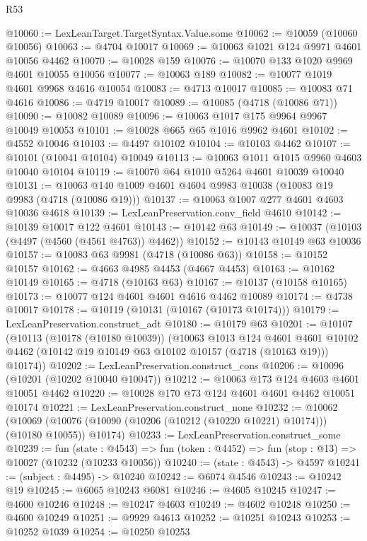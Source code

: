 \begin{lexlean}{R53}
\begin{coremodule}
@10060 := LexLeanTarget.TargetSyntax.Value.some
@10062 := @10059 (@10060 @10056)
@10063 := @4704 @10017
@10069 := @10063 @1021 @124 @9971 @4601 @10056 @4462
@10070 := @10028 @159
@10076 := @10070 @133 @1020 @9969 @4601 @10055 @10056
@10077 := @10063 @189
@10082 := @10077 @1019 @4601 @9968 @4616 @10054
@10083 := @4713 @10017
@10085 := @10083 @71 @4616
@10086 := @4719 @10017
@10089 := @10085 (@4718 (@10086 @71))
@10090 := @10082 @10089
@10096 := @10063 @1017 @175 @9964 @9967 @10049 @10053
@10101 := @10028 @665 @65 @1016 @9962 @4601
@10102 := @4552 @10046
@10103 := @4497 @10102
@10104 := @10103 @4462
@10107 := @10101 (@10041 @10104) @10049
@10113 := @10063 @1011 @1015 @9960 @4603 @10040 @10104
@10119 := @10070 @64 @1010 @5264 @4601 @10039 @10040
@10131 := @10063 @140 @1009 @4601 @4604 @9983 @10038 (@10083 @19 @9983 (@4718 (@10086 @19)))
@10137 := @10063 @1007 @277 @4601 @4603 @10036 @4618
@10139 := LexLeanPreservation.conv_field @4610
@10142 := @10139 @10017 @122 @4601
@10143 := @10142 @63
@10149 := @10037 (@10103 (@4497 (@4560 (@4561 @4763)) @4462))
@10152 := @10143 @10149 @63 @10036
@10157 := @10083 @63 @9981 (@4718 (@10086 @63))
@10158 := @10152 @10157
@10162 := @4663 @4985 @4453 (@4667 @4453)
@10163 := @10162 @10149
@10165 := @4718 (@10163 @63)
@10167 := @10137 (@10158 @10165)
@10173 := @10077 @124 @4601 @4601 @4616 @4462 @10089
@10174 := @4738 @10017
@10178 := @10119 (@10131 (@10167 (@10173 @10174)))
@10179 := LexLeanPreservation.construct_adt
@10180 := @10179 @63
@10201 := @10107
    (@10113
      (@10178 (@10180 @10039))
      (@10063
        @1013
        @124
        @4601
        @4601
        @10102
        @4462
        (@10142 @19 @10149 @63 @10102 @10157 (@4718 (@10163 @19)))
        @10174))
@10202 := LexLeanPreservation.construct_cons
@10206 := @10096 (@10201 (@10202 @10040 @10047))
@10212 := @10063 @173 @124 @4603 @4601 @10051 @4462
@10220 := @10028 @170 @73 @124 @4601 @4601 @4462 @10051 @10174
@10221 := LexLeanPreservation.construct_none
@10232 := @10062
    (@10069 (@10076 (@10090 (@10206 (@10212 (@10220 @10221) @10174))) (@10180 @10055)) @10174)
@10233 := LexLeanPreservation.construct_some
@10239 := fun (state : @4543) =>
  fun (token : @4452) => fun (stop : @13) => @10027 (@10232 (@10233 @10056))
@10240 := (state : @4543) -> @4597
@10241 := (subject : @4495) -> @10240
@10242 := @6074 @4546
@10243 := @10242 @19
@10245 := @6065 @10243 @6081
@10246 := @4605 @10245
@10247 := @4600 @10246
@10248 := @10247 @4603
@10249 := @4602 @10248
@10250 := @4600 @10249
@10251 := @9929 @4613
@10252 := @10251 @10243
@10253 := @10252 @1039
@10254 := @10250 @10253

\end{coremodule}
\end{lexlean}
